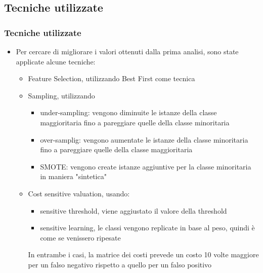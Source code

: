\documentclass[10pt]{beamer}
\begin{document}
\begin{frame}
\section{Tecniche utilizzate}
\frametitle{Tecniche utilizzate}
\begin{itemize}
\item Per cercare di migliorare i valori ottenuti dalla prima analisi, sono state applicate alcune tecniche:
\begin{itemize}
\item Feature Selection, utilizzando Best First come tecnica
\item Sampling, utilizzando 
\begin{itemize}
\item under-sampling: vengono diminuite le istanze della classe maggioritaria fino a pareggiare quelle della classe minoritaria
\item over-samplig: vengono aumentate le istanze della classe minoritaria fino a pareggiare quelle della classe maggioritaria
\item SMOTE: vengono create istanze aggiuntive per la classe minoritaria in maniera "sintetica"
\end{itemize}
\item Cost sensitive valuation, usando:
\begin{itemize}
\item sensitive threshold, viene aggiustato il valore della threshold
\item sensitive learning, le classi vengono replicate in base al peso, quindi è come se venissero ripesate
\end{itemize}
In entrambe i casi, la matrice dei costi prevede un costo 10 volte maggiore per un falso negativo rispetto a quello per un falso positivo
\end{itemize}
\end{itemize} 
\end{frame}
\end{document}
